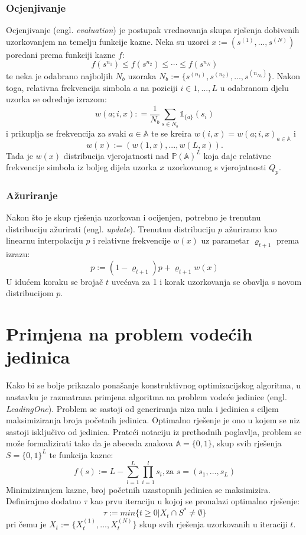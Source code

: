 \documentclass[times, utf8, zavrsni]{fer}
\begin{document}
\subsection{Ocjenjivanje}
Ocjenjivanje (engl. \textit{evaluation}) je postupak vrednovanja skupa rješenja dobivenih uzorkovanjem na temelju funkcije kazne.
Neka su uzorci $x := (s^{(1)},...,s^{(N)})$ poredani prema funkciji kazne $f$:
$$
f(s^{n_1}) \leq f(s^{n_2}) \leq \cdots \leq f(s^{n_N})
$$
te neka je odabrano najboljih $N_b$ uzoraka $N_b := \{ s^{(n_1)}, s^{(n_2)},...,s^{(n_{N_b})} \}$. Nakon toga, relativna frekvencija simbola $a$ na poziciji $i \in {1,..., L}$
u odabranom djelu uzorka se određuje izrazom:
$$
w(a; i, x) : = \frac{1}{N_b} \sum_{s \in N_b} \mathds{1}_{\{a\}}(s_i)
$$
i prikuplja se frekvencija za svaki $a \in \mathbb{A}$ te se kreira $w(i, x) = w(a;i, x)_{a \in \mathbb{A}}$ i
$$
w(x) := (w(1, x),...,w(L, x)).
$$
Tada je $w(x)$ distribucija vjerojatnosti nad $\mathbb{P}(\mathbb{A})^L$ koja daje relativne frekvencije simbola iz boljeg dijela uzorka $x$ uzorkovanog s vjerojatnosti $Q_p$.

\subsection{Ažuriranje}
Nakon što je skup rješenja uzorkovan i ocijenjen, potrebno je trenutnu distribuciju ažurirati (engl. \textit{update}).
Trenutnu distribuciju $p$ ažuriramo kao linearnu interpolaciju $p$ i relativne frekvencije $w(x)$ uz parametar $\varrho_{t+1}$ prema izrazu:
$$
p := (1 - \varrho_{t+1})p + \varrho_{t+1} w(x)
$$
U idućem koraku se brojač $t$ uvećava za 1 i korak uzorkovanja se obavlja s novom distribucijom $p$.


\chapter{Primjena na problem vodećih jedinica}
Kako bi se bolje prikazalo ponašanje konstruktivnog optimizacijskog algoritma, u nastavku je razmatrana primjena algoritma na
problem vodeće jedinice (engl. \textit{LeadingOne}). Problem se sastoji od generiranja niza nula i jedinica s ciljem maksimiziranja broja početnih jedinica. Optimalno
rješenje je ono u kojem se niz sastoji isključivo od jedinica. Prateći notaciju iz prethodnih poglavlja, problem se može formalizirati tako da
je abeceda znakova $\mathbb{A} = \{0, 1\}$, skup svih rješenja $S = \{0, 1\}^L$ te funkcija kazne:
$$
f(s) := L - \sum^L_{l=1} \prod^l_{i=1} s_i, \text{za }  s=(s_1,..., s_L)
$$
Minimiziranjem kazne, broj početnih uzastopnih jedinica se maksimizira.
Definirajmo dodatno $\tau$ kao prvu iteraciju u kojoj se pronalazi optimalno rješenje:
$$
\tau := min \{ t \geq 0 | X_t \cap S^* \neq \emptyset \}
$$
pri čemu je $X_t :=  \{ X^{(1)}_t,...,X^{(N)}_t \} $ skup svih rješenja uzorkovanih u iteraciji $t$.
\end{document}
